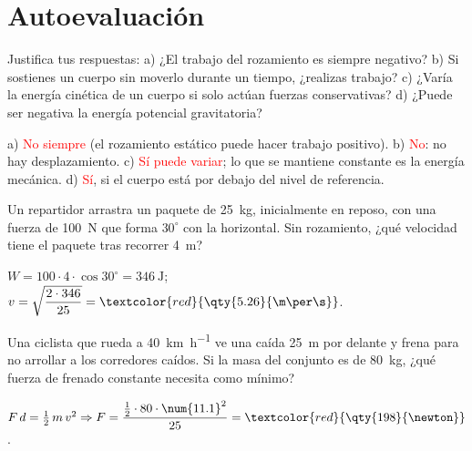 \section{Autoevaluación}\label{sec:ud12-autoevaluacion}

\begin{exercise}
    Justifica tus respuestas: a) ¿El trabajo del rozamiento es siempre negativo? b) Si sostienes un cuerpo sin moverlo durante un
    tiempo, ¿realizas trabajo? c) ¿Varía la energía cinética de un cuerpo si solo actúan fuerzas conservativas? d) ¿Puede ser negativa
    la energía potencial gravitatoria?
    \begin{solu}
        a) \textcolor{red}{No siempre} (el rozamiento estático puede hacer trabajo positivo). b) \textcolor{red}{No}: no hay
        desplazamiento. c) \textcolor{red}{Sí puede variar}; lo que se mantiene constante es la energía mecánica. d) \textcolor{red}{Sí},
        si el cuerpo está por debajo del nivel de referencia.
    \end{solu}
\end{exercise}

\begin{exercise}
    Un repartidor arrastra un paquete de \qty{25}{\kg}, inicialmente en reposo, con una fuerza de \qty{100}{\newton} que forma
    \(30^\circ\) con la horizontal. Sin rozamiento, ¿qué velocidad tiene el paquete tras recorrer \qty{4}{\m}?
    \begin{solu}
        \(W = 100 \cdot 4 \cdot \cos 30^\circ = \qty{346}{\joule}\); \(v = \sqrt{\dfrac{2 \cdot 346}{25}} = \textcolor{red}{\qty{5.26}{\m\per\s}}\).
    \end{solu}
\end{exercise}

\begin{exercise}
    Una ciclista que rueda a \qty{40}{\km\per\hour} ve una caída \qty{25}{\m} por delante y frena para no arrollar a los corredores
    caídos. Si la masa del conjunto es de \qty{80}{\kg}, ¿qué fuerza de frenado constante necesita como mínimo?
    \begin{solu}
        \(F\,d = \frac{1}{2}\,m\,v^2 \Rightarrow F = \dfrac{\frac{1}{2} \cdot 80 \cdot \num{11.1}^2}{25} = \textcolor{red}{\qty{198}{\newton}}\).
    \end{solu}
\end{exercise}

